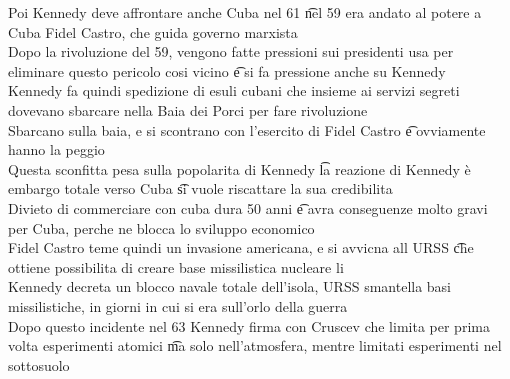 \documentclass[12pt]{article}
\begin{document}
Poi Kennedy deve affrontare anche Cuba nel 61 \t nel 59 era andato al potere a Cuba Fidel Castro, che guida governo marxista \\
Dopo la rivoluzione del 59, vengono fatte pressioni sui presidenti usa per eliminare questo pericolo cosi vicino \t e si fa pressione anche su Kennedy \\
Kennedy fa quindi spedizione di esuli cubani che insieme ai servizi segreti dovevano sbarcare nella Baia dei Porci per fare rivoluzione \\
Sbarcano sulla baia, e si scontrano con l'esercito di Fidel Castro \t e ovviamente hanno la peggio \\
Questa sconfitta pesa sulla popolarita di Kennedy \t la reazione di Kennedy è embargo totale verso Cuba \t si vuole riscattare la sua credibilita \\
Divieto di commerciare con cuba dura 50 anni \t e avra conseguenze molto gravi per Cuba, perche ne blocca lo sviluppo economico \\
Fidel Castro teme quindi un invasione americana, e si avvicna all URSS \t che ottiene possibilita di creare base missilistica nucleare li \\
Kennedy decreta un blocco navale totale dell'isola, URSS smantella basi missilistiche, in giorni in cui si era sull'orlo della guerra \\
Dopo questo incidente nel 63 Kennedy firma con Cruscev che limita per prima volta esperimenti atomici \t ma solo nell'atmosfera, mentre limitati esperimenti nel sottosuolo
\end{document}
